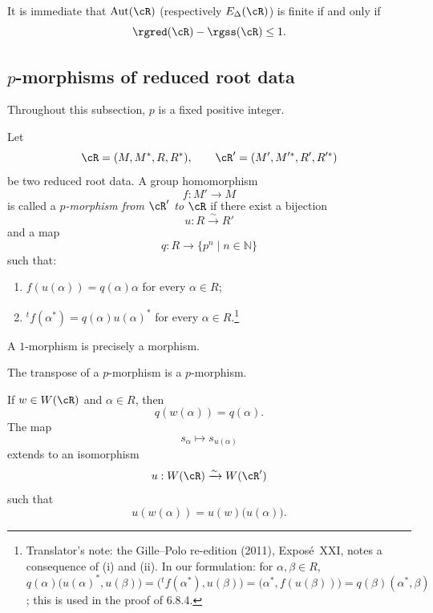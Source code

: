 \begin{remark}\label{sga3:XXI:6.7.8}
It is immediate that \(\operatorname{Aut}(\cR)\) (respectively
\(E_\Delta(\cR)\)) is finite if and only if
\[
 \rgred(\cR)-\rgss(\cR)\leq1.
\]
\end{remark}

\subsection{\(p\)-morphisms of reduced root data}
\label{sga3:XXI:6.8}

Throughout this subsection, \(p\) is a fixed positive integer.

\begin{definition}\label{sga3:XXI:6.8.1}
Let
\[
 \cR=(M,M^\ast,R,R^\ast),
 \qquad
 \cR'=(M',M'^\ast,R',R'^\ast)
\]
be two reduced root data. A group homomorphism
\[
 f:M'\longrightarrow M
\]
is called a \emph{\(p\)-morphism from \(\cR'\) to \(\cR\)} if
there exist a bijection
\[
 u:R\xrightarrow{\sim}R'
\]
and a map
\[
 q:R\longrightarrow\{p^n\mid n\in\mathbb N\}
\]
such that:
\begin{enumerate}
\item[(i)] \(f(u(\alpha))=q(\alpha)\alpha\) for every
  \(\alpha\in R\);
\item[(ii)] \({}^tf(\alpha^\ast)=q(\alpha)u(\alpha)^\ast\) for
  every \(\alpha\in R\).\footnote{Translator's note: the Gille--Polo re-edition (2011), Exposé~XXI, notes a consequence of (i) and (ii). In
our formulation: for \(\alpha,\beta\in R\),
\(q(\alpha)\bigl(u(\alpha)^\ast,u(\beta)\bigr)=\bigl({}^tf(\alpha^\ast),u(\beta)\bigr)
=\bigl(\alpha^\ast,f(u(\beta))\bigr)=q(\beta)(\alpha^\ast,\beta)\); this is used in the
proof of 6.8.4.}
\end{enumerate}
\end{definition}

\begin{corollary}\label{sga3:XXI:6.8.2}
A \(1\)-morphism is precisely a morphism.
\end{corollary}

\begin{corollary}\label{sga3:XXI:6.8.3}
The transpose of a \(p\)-morphism is a \(p\)-morphism.
\end{corollary}

\begin{lemma}\label{sga3:XXI:6.8.4}
If \(w\in W(\cR)\) and \(\alpha\in R\), then
\[
 q(w(\alpha))=q(\alpha).
\]
The map
\[
 s_\alpha\longmapsto s_{u(\alpha)}
\]
extends to an isomorphism
\[
 u:W(\cR)\xrightarrow{\sim}W(\cR')
\]
such that
\[
 u(w(\alpha))=u(w)\bigl(u(\alpha)\bigr).
\]
\end{lemma}

